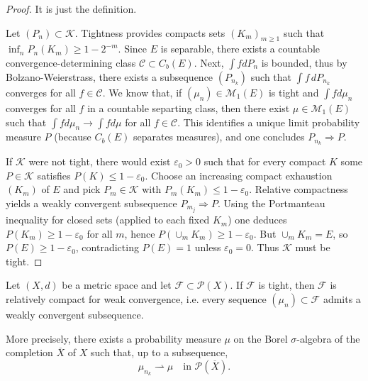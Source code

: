\begin{proof}
 It is just the definition.

 Let $(P_n)\subset\mathcal{K}$. Tightness provides compacts sets $(K_m)_{m \geq 1}$ such that
$\inf_n P_n(K_m)\ge 1-2^{-m}$. Since $E$ is separable, there exists a countable convergence-determining class
$\mathcal{C}\subset C_b(E)$. Next, $\int f dP_n$ is bounded, thus by Bolzano-Weierstrass, there exists a subsequence $(P_{n_k})$ such that $\int f\,dP_{n_k}$
converges for all $f\in\mathcal{C}$. We know that, if $(\mu_n) \in \mathcal{M}_1(E)$ is tight and $\int f d\mu_n$ converges for all $f$ in a countable separting class, then there exist $\mu \in \mathcal{M}_1(E)$ such that $\int f d\mu_n \to \int f d\mu$ for all $f\in\mathcal{C}$.
This identifies a unique limit probability measure $P$ (because $C_b(E)$ separates measures),
and one concludes $P_{n_k}\Rightarrow P$.

 If $\mathcal{K}$ were not tight, there would exist $\varepsilon_0>0$ such that for every compact $K$
some $P\in\mathcal{K}$ satisfies $P(K)\le 1-\varepsilon_0$. Choose an increasing compact exhaustion $(K_m)$ of $E$
and pick $P_m\in\mathcal{K}$ with $P_m(K_m)\le 1-\varepsilon_0$.
Relative compactness yields a weakly convergent subsequence $P_{m_j}\Rightarrow P$.
Using the Portmanteau inequality for closed sets (applied to each fixed $K_m$) one deduces $P(K_m)\ge 1-\varepsilon_0$ for all $m$,
hence $P(\cup_m K_m)\ge 1-\varepsilon_0$. But $\cup_m K_m=E$, so $P(E)\ge 1-\varepsilon_0$, contradicting $P(E)=1$ unless $\varepsilon_0=0$.
Thus $\mathcal{K}$ must be tight.
\end{proof}

\begin{theorem}
\label{thm:prokhorov_metric}
Let $(X,d)$ be a metric space and let $\mathcal{F}\subset \mathcal{P}(X)$.
If $\mathcal{F}$ is tight, then $\mathcal{F}$ is relatively compact for weak convergence, i.e. every sequence
$(\mu_n)\subset \mathcal{F}$ admits a weakly convergent subsequence.

More precisely, there exists a probability measure $\mu$ on the Borel $\sigma$-algebra of the completion
$\overline{X}$ of $X$ such that, up to a subsequence,
\[
\mu_{n_k} \rightharpoonup \mu \quad \text{in } \mathcal{P}(\overline{X}).
\]
\end{theorem}

